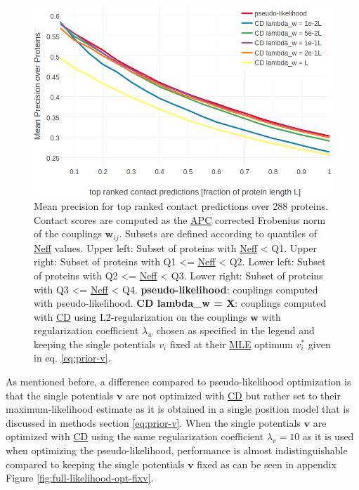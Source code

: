 \documentclass[11pt,a4paper,twoside]{book}
\newcommand{\eq}{\!=\!}
\renewcommand{\v}{\mathbf{v}}
\newcommand{\vi}{v_{i}}
\newcommand{\w}{\mathbf{w}}
\newcommand{\wij}{\mathbf{w}_{ij}}
\theoremstyle{definition}
\theoremstyle{definition}
\theoremstyle{remark}
\begin{document}
\begin{figure}

{\centering \includegraphics[width=0.9\linewidth]{img/full_likelihood/sgd/precision_vs_rank_regularizer} 

}

\caption{Mean precision for top ranked
contact predictions over 288 proteins. Contact scores are computed as
the \protect\hyperlink{abbrev}{APC} corrected Frobenius norm of the
couplings \(\wij\). Subsets are defined according to quantiles of
\protect\hyperlink{abbrev}{Neff} values. Upper left: Subset of proteins
with \protect\hyperlink{abbrev}{Neff} \textless{} Q1. Upper right:
Subset of proteins with Q1 \textless{}= \protect\hyperlink{abbrev}{Neff}
\textless{} Q2. Lower left: Subset of proteins with Q2 \textless{}=
\protect\hyperlink{abbrev}{Neff} \textless{} Q3. Lower right: Subset of
proteins with Q3 \textless{}= \protect\hyperlink{abbrev}{Neff}
\textless{} Q4. \textbf{pseudo-likelihood}: couplings computed with
pseudo-likelihood. \textbf{CD lambda\_w = X}: couplings computed with
\protect\hyperlink{abbrev}{CD} using L2-regularization on the couplings
\(\w\) with regularization coefficient \(\lambda_w\) chosen as specified
in the legend and keeping the single potentials \(\vi\) fixed at their
\protect\hyperlink{abbrev}{MLE} optimum \(\vi^*\) given in eq.
\eqref{eq:prior-v}.}\label{fig:precison-cd-regularization}
\end{figure}

As mentioned before, a difference compared to pseudo-likelihood
optimization is that the single potentials \(\v\) are not optimized with
\protect\hyperlink{abbrev}{CD} but rather set to their
maximum-likelihood estimate as it is obtained in a single position model
that is discussed in methods section \eqref{eq:prior-v}. When the single
potentials \(\v\) are optimized with \href{abbrev}{CD} using the same
regularization coefficient \(\lambda_v \eq 10\) as it is used when
optimizing the pseudo-likelihood, performance is almost
indistinguishable compared to keeping the single potentials \(\v\) fixed
as can be seen in appendix Figure \ref{fig:full-likelihood-opt-fixv}.
\end{document}
